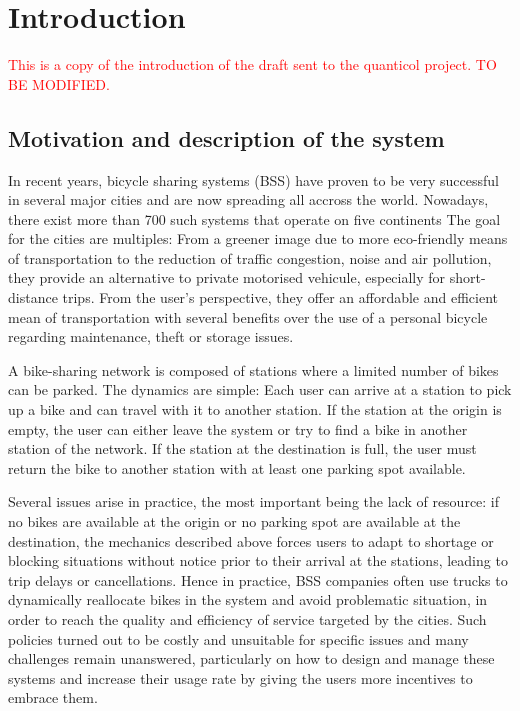 \section{Introduction}
\textcolor{red}{This is a copy of the introduction of the draft sent to the quanticol project. TO BE MODIFIED.}

\subsection{Motivation and description of the system}
In recent years, bicycle sharing systems (BSS) have proven to be very
successful in several major cities and are now spreading all accross
the world.  Nowadays, there exist more than 700 such systems that
operate on five continents The goal for the cities are multiples: From
a greener image due to more eco-friendly means of transportation to
the reduction of traffic congestion, noise and air pollution, they
provide an alternative to private motorised vehicule, especially for
short-distance trips.  From the user's perspective, they offer an
affordable and efficient mean of transportation with several benefits
over the use of a personal bicycle regarding maintenance, theft or
storage issues.

A bike-sharing network is composed of stations where a limited number
of bikes can be parked.  The dynamics are simple: Each user can arrive
at a station to pick up a bike and can travel with it to another
station.  If the station at the origin is empty, the user can either
leave the system or try to find a bike in another station of the
network.  If the station at the destination is full, the user must
return the bike to another station with at least one parking spot
available.

Several issues arise in practice, the most important being the lack of
resource: if no bikes are available at the origin or no parking spot
are available at the destination, the mechanics described above forces
users to adapt to shortage or blocking situations without notice prior
to their arrival at the stations, leading to trip delays or
cancellations.  Hence in practice, BSS companies often use trucks to
dynamically reallocate bikes in the system and avoid problematic
situation, in order to reach the quality and efficiency of service
targeted by the cities.  Such policies turned out to be costly and
unsuitable for specific issues and many challenges remain unanswered,
particularly on how to design and manage these systems and increase
their usage rate by giving the users more incentives to embrace them.

